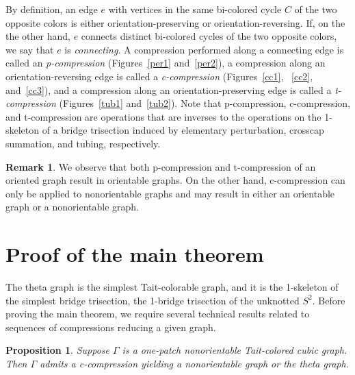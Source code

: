 \documentclass[11pt, oneside]{amsart}
\theoremstyle{theorem}
\newtheorem{proposition}[theorem]{Proposition}
\theoremstyle{definition}
\newtheorem{remark}[theorem]{Remark}
\theoremstyle{theorem}
\begin{document}
By definition, an edge $e$ with vertices in the same bi-colored cycle $C$ of the two opposite colors is either orientation-preserving or orientation-reversing.  If, on the the other hand, $e$ connects distinct bi-colored cycles of the two opposite colors, we say that $e$ is \emph{connecting}.  A compression performed along a connecting edge is called an \emph{p-compression} (Figures~\ref{per1} and~\ref{per2}),  a compression along an orientation-reversing edge is called a \emph{c-compression} (Figures~\ref{cc1}, ~\ref{cc2}, and~\ref{cc3}), and a compression along an orientation-preserving edge is called a \emph{t-compression} (Figures~\ref{tub1} and~\ref{tub2}).  Note that p-compression, c-compression, and t-compression are operations that are inverses to the operations on the 1-skeleton of a bridge trisection induced by elementary perturbation, crosscap summation, and tubing, respectively.

\begin{remark}
\label{rem:ortn}
	We observe that both p-compression and t-compression of an oriented graph result in orientable graphs.  On the other hand, c-compression can only be applied to nonorientable graphs and may result in either an orientable graph or a nonorientable graph.
\end{remark}

\section{Proof of the main theorem}\label{mainproof}

The theta graph is the simplest Tait-colorable graph, and it is the 1-skeleton of the simplest bridge trisection, the 1-bridge trisection of the unknotted $S^2$.  Before proving the main theorem, we require several technical results related to sequences of compressions reducing a given graph.

\begin{proposition}\label{ugh}
Suppose $\Gamma$ is a one-patch nonorientable Tait-colored cubic graph.  Then $\Gamma$ admits a c-compression yielding a nonorientable graph or the theta graph.
\end{proposition}
\end{document}
